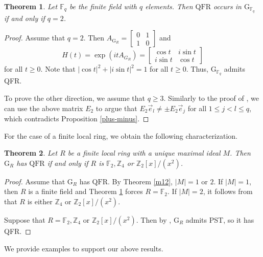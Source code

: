 \documentclass[12pt]{amsart}
\numberwithin{equation}{section}
\newtheorem{thm}{Theorem}[section]
\theoremstyle{definition}
\theoremstyle{definition} \numberwithin{equation}{section}
\newcommand{\G}{\mathrm{G}}
\newcommand{\QFR}{\mathrm{QFR}}
\begin{document}
\begin{thm}\label{q=2}
    Let $\mathbb{F}_q$ be the finite field with $q$ elements. Then $\QFR$ occurs in  $\G_{\mathbb{F}_q}$ if and only if $q = 2$.
\end{thm}
\begin{proof}
    Assume that $q = 2$. Then $A_{\G_R}= \left [
            \begin{array}{cc}
               0  & 1  \\
               1  & 0
            \end{array}
            \right ]$ 
            and 
            $$
            H(t) = \exp{(itA_{G_R})}
            = \begin{bmatrix}
                \cos{t} & i \sin{t} \\
                i \sin{t} & \cos{t}
            \end{bmatrix}
            $$ 
            for all $t \ge 0$. Note that $|\cos{t}|^2 + |i \sin{t}|^2 = 1$ for all $t \ge 0$. Thus, $\G_{\mathbb{F}_q}$ admits QFR. 
            
            To prove the other direction, we assume that $q \ge 3$. Similarly to the proof of \cite[Theorem 2.3]{MY}, we can use the above matrix $E_2$ to argue that $E_2 \vec{e}_l \neq \pm E_2 \vec{e}_j$ for all $1 \le j < l \leq q$, which contradicts Proposition \ref{plus-minus}.
\end{proof}

For the case of a finite local ring, we obtain the following characterization.

\begin{thm} \label{mainlocal}
     Let $R$ be a finite local ring with a unique maximal ideal $M$. Then $\G_R$ has $\QFR$ if and only if $R$ is $\mathbb{F}_2, \mathbb{Z}_4$ or $\mathbb{Z}_2[x]/(x^2)$.
\end{thm}
\begin{proof}
   Assume that $\G_R$ has $\QFR$. By Theorem \ref{m12}, $|M| = 1$ or $2$. If $|M| = 1$, then $R$ is a finite field and Theorem \ref{q=2} forces $R = \mathbb{F}_2$. If $|M| = 2$, it follows from \cite{GN} that $R$ is either $\mathbb{Z}_4$ or $\mathbb{Z}_{2} [ x ] /(x^2)$.

    Suppose that $R = \mathbb{F}_2, \mathbb{Z}_4$ or $\mathbb{Z}_{2} [ x ] /(x^2)$. Then by \cite[Theorem 2.4]{MY}, $\G_R$ admits PST, so it has QFR. 
\end{proof}

We provide examples to support our above results.
\end{document}
